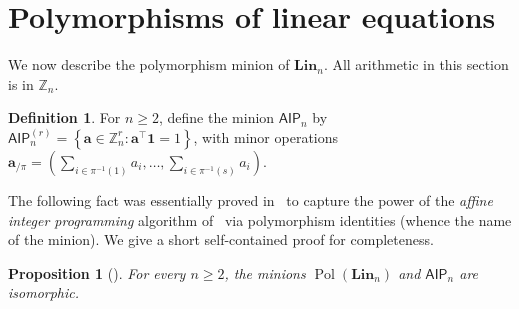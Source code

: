 \documentclass[11pt]{article}
\newcommand{\Z}{\mathbb Z}
\newcommand{\Lin}{\mathbf{Lin}}
\newcommand{\AIP}{\mathsf{AIP}}
\DeclareMathOperator{\Pol}{Pol}
\newcommand{\bone}{\mathbf{1}}
\newcommand{\ba}{\mathbf{a}}
\theoremstyle{plain}
\newtheorem{proposition}[theorem]{Proposition}
\theoremstyle{definition}
\newtheorem{definition}[theorem]{Definition}
\theoremstyle{remark}
\begin{document}
\section{Polymorphisms of linear equations}
We now describe the polymorphism minion of $\Lin_n$. All arithmetic in
this section is in $\Z_n$.
\begin{definition}
For $n\geq2$, define the minion $\AIP_n$ by
 $\AIP_n^{(r)}
   =\left\{\ba\in\Z_n^r:
                  \ba^\top\bone=1\right\}$,
with minor operations
$\ba_{/\pi}
   =\left(\sum_{i\in\pi^{-1}(1)}a_i,\dots,
           \sum_{i\in\pi^{-1}(s)}a_i\right)$.
\end{definition}
%
The following fact was essentially proved in~\cite{BBKO21} to capture the power of the \textit{affine integer programming} algorithm of~\cite{BG18} via polymorphism identities (whence the name of the minion).
%
We give a short self-contained proof for completeness.  

\begin{proposition}[]
\label{prop_pol}
For every $n\geq2$, the minions $\Pol(\Lin_n)$ and
$\AIP_n$ are isomorphic. 
\end{proposition}
\end{document}
